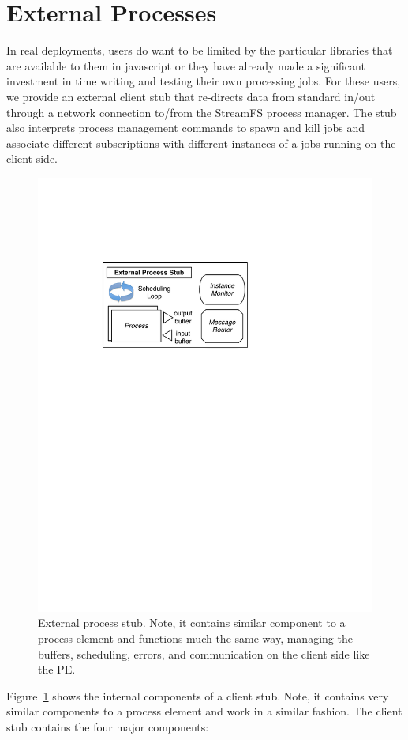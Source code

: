 \section{External Processes}
\label{sec:externalprocs}

In real deployments, %
users do want to be limited by the particular libraries that are available to them in javascript or they have already made
a significant investment in time writing and testing their own processing jobs.  For these users, we provide an external client stub that 
re-directs data from standard in/out through a network connection to/from the StreamFS process manager.  The stub also interprets
process management commands to spawn and kill jobs and associate different subscriptions with different instances of a jobs 
running on the client side.

\begin{figure}[h!] %
\centering
\includegraphics[width=0.55\columnwidth]{figs/external_stub}
\caption{External process stub.  Note, it contains similar component to a process element and functions much the same way, 
managing the buffers, scheduling, errors, and communication on the client side like the PE.}
\label{fig:external_stub}
\end{figure}

Figure~\ref{fig:external_stub} shows the internal components of a client stub.  Note, it contains very similar components to
a process element and work in a similar fashion.  The client stub contains the four major components:

